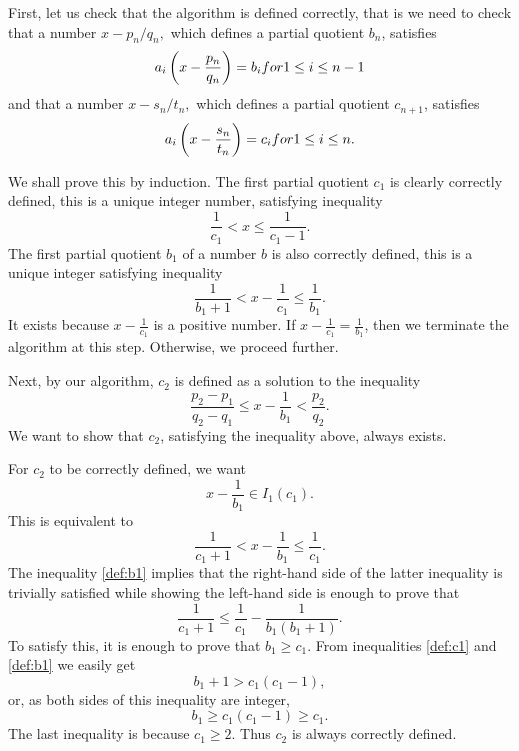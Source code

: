 \documentclass{amsart}
\theoremstyle{definition}
\newcommand{\0}{\mbf 0}%
\renewcommand{\text}{\textup}
\begin{document}
First, let us check that the algorithm is defined correctly, that is we need to check that a number
$
x - p_n/q_n,
$
which defines a partial quotient $b_n$, satisfies
\begin{equation}\label{condition:cylinder:x-pq}
a_i \left( x - \frac{p_n}{q_n} \right) = b_i  \text{ for } 1\leq i \leq n-1
\end{equation}
and that a number 
$
x-s_n/t_n,
$
which defines a partial quotient $c_{n+1}$, satisfies
\begin{equation}\label{condition:cylinder:x-st}
a_i \left( x - \frac{s_n}{t_n} \right) = c_i  \text{ for } 1\leq i \leq n.
\end{equation}

We shall prove this by induction. The first partial quotient $c_1$ is clearly correctly defined, this is a unique integer number, satisfying inequality
\begin{equation}\label{def:c1}
\frac{1}{c_1} < x \leq \frac{1}{c_1-1}.
\end{equation}
The first partial quotient $b_1$ of a number $b$ is also correctly defined, this is a unique integer satisfying inequality
\begin{equation}\label{def:b1}
\frac{1}{b_1+1} < x-\frac{1}{c_1} \leq \frac{1}{b_1}.
\end{equation}
It exists because $x-\frac{1}{c_1}$ is a positive number. If $x-\frac{1}{c_1}=\frac{1}{b_1}$, then we terminate the algorithm at this step. Otherwise, we proceed further.

Next, by our algorithm, $c_2$ is defined as a solution to the inequality
$$
\frac{p_2-p_1}{q_2-q_1} \leq x-\frac{1}{b_1} < \frac{p_2}{q_2}.
$$
We want to show that $c_2$, satisfying the inequality above, always exists.

For $c_2$ to be correctly defined, we want
$$
x-\frac{1}{b_1} \in I_1(c_1).
$$
This is equivalent to 
$$
\frac{1}{c_1+1} < x-\frac{1}{b_1} \leq  \frac{1}{c_1}.
$$
The inequality \eqref{def:b1} implies that the right-hand side of the latter inequality is trivially satisfied while showing the left-hand side is enough to prove that
$$
\frac{1}{c_1+1}  \leq \frac{1}{c_1} - \frac{1}{b_1(b_1+1)}.
$$
To satisfy this, it is enough to prove that $b_1\geq c_1.$
From inequalities \eqref{def:c1} and \eqref{def:b1} we easily get
$$
b_1+1 > c_1(c_1-1),
$$
or, as both sides of this inequality are integer,
$$
b_1 \geq c_1(c_1-1) \geq c_1.
$$
The last inequality is because $c_1\geq2$. Thus $c_2$ is always correctly defined.
\end{document}
